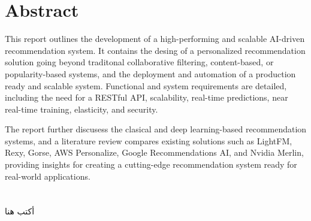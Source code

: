 \cleardoublepage {} {} \mtcaddchapter
\chapter*{Abstract}
This report outlines the development of a high-performing and scalable AI-driven recommendation system. It contains the desing of a personalized recommendation solution going beyond traditonal collaborative filtering, content-based, or popularity-based systems, and the deployment and automation of a production ready and scalable system. Functional and system requirements are detailed, including the need for a RESTful API, scalability, real-time predictions, near real-time training, elasticity, and security. 

The report further discusess the clasical and deep learning-based recommendation systems, and a literature review compares existing solutions such as LightFM, Rexy, Gorse, AWS Personalize, Google Recommendations AI, and Nvidia Merlin, providing insights for creating a cutting-edge recommendation system ready for real-world applications.

\cleardoublepage {} {} \mtcaddchapter
\chapter*{}
\begin{RLtext}
أكتب هنا
\end{RLtext}

\justifying